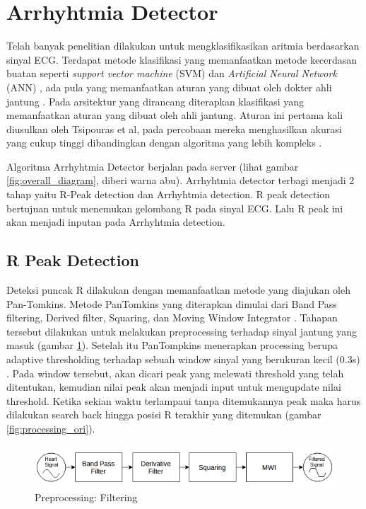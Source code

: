 \documentclass[]{indojc}
\begin{document}
\section{Arrhyhtmia Detector}
Telah banyak penelitian dilakukan untuk mengklasifikasikan aritmia berdasarkan sinyal ECG. Terdapat metode klasifikasi yang memanfaatkan metode kecerdasan buatan seperti \textit{support vector machine} (SVM) \cite{aritmia_svm} dan \textit{Artificial Neural Network} (ANN) \cite{aritmia_ann}, ada pula yang memanfaatkan aturan yang dibuat oleh dokter ahli jantung \cite{tsipouras}. Pada arsitektur yang dirancang diterapkan klasifikasi yang memanfaatkan aturan yang dibuat oleh ahli jantung. Aturan ini pertama kali diusulkan oleh Tsipouras et al, pada percobaan mereka menghasilkan akurasi yang cukup tinggi dibandingkan dengan algoritma yang lebih kompleks \cite{tsipouras}.

Algoritma Arrhyhtmia Detector berjalan pada server (lihat gambar \ref{fig:overall_diagram}, diberi warna abu). Arrhyhtmia detector terbagi menjadi 2 tahap yaitu R-Peak detection dan Arrhyhtmia detection. R peak detection bertujuan untuk menemukan gelombang R pada sinyal ECG. Lalu R peak ini akan menjadi inputan pada Arrhyhtmia detection.

\subsection{R Peak Detection}
Deteksi puncak R dilakukan dengan memanfaatkan metode yang diajukan oleh Pan-Tomkins. Metode PanTomkins yang diterapkan dimulai dari Band Pass filtering, Derived filter, Squaring, dan Moving Window Integrator \cite{pantom}. Tahapan tersebut dilakukan untuk melakukan preprocessing terhadap sinyal jantung yang masuk (gambar \ref{fig:preprocessing}). Setelah itu PanTompkins menerapkan processing berupa adaptive thresholding terhadap sebuah window sinyal yang berukuran kecil (0.3s) \cite{pantom}. Pada window tersebut, akan dicari peak yang melewati threshold yang telah ditentukan, kemudian nilai peak akan menjadi input untuk  mengupdate nilai threshold. Ketika sekian waktu terlampaui tanpa ditemukannya peak maka harus dilakukan search back hingga posisi R terakhir yang ditemukan (gambar \ref{fig:processing_ori}).

\begin{figure}[htbp]
\centerline{\includegraphics[scale=0.4]{images/preprocessing.png}}
\caption{Preprocessing: Filtering}
\label{fig:preprocessing}
\end{figure}
\end{document}
